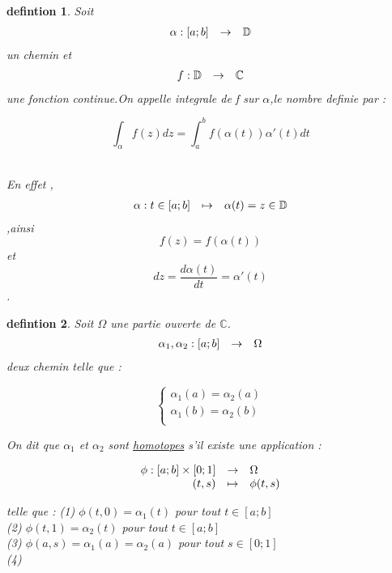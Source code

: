 \documentclass[a4paper,12pt]{book}
\newtheorem{definition}{defintion}[section]
\begin{document}
   \begin{definition}
   	Soit 
   	\[ \begin{array}{r c l}
   		\alpha: [a;b] & \to &  \mathbb{D}\\
   	\end{array}
   	\]un chemin et 
   	\[
   	\begin{array}{r c l}
   		f: \mathbb{D} & \to & \mathbb{C}
   	\end{array}\]une fonction continue.On appelle integrale de f sur $\alpha$,le nombre definie par :\\
   \begin{center}
   	 $$\int_{\alpha}f(z)dz = \int_{a}^{b}f(\alpha(t))\alpha'(t)dt$$\\
   \end{center}
En effet ,\[
\begin{array}{r c l}
	\alpha: t\in [a;b] & \mapsto & \alpha(t)=z \in \mathbb{D}
\end{array}\],ainsi $$f(z)=f(\alpha(t))$$ et $$ dz=\frac{d\alpha(t)}{dt}=\alpha'(t)$$.
  \end{definition}
\begin{definition}
	Soit $\Omega$ une partie ouverte de $\mathbb{C}$.
	\[
	\begin{array}{r c l}
		\alpha_1,\alpha_2 : [a;b] & \to & \Omega
	\end{array}\]deux chemin telle que :
     \begin{center}
     	\begin{equation*}
     	\begin{cases}
     	\alpha_1(a)= \alpha_2(a)\\
     	\alpha_1(b)= \alpha_2(b)\\
     	
     \end{cases}
 \end{equation*}
     \end{center}On dit que $\alpha_1$ et $\alpha_2$ sont \underline{homotopes} s'il existe une application :
 \begin{center}\[
 	\begin{array}{r c l}
 		\phi : [a;b] \times [0;1] & \to & \Omega\\
 		(t,s) & \mapsto & \phi (t,s)
 	\end{array}\]
 \end{center}telle que :
(1) $\phi(t,0)= \alpha_1(t)$ pour tout $ t\in [a;b]$\\
(2) $\phi(t,1)= \alpha_2(t)$ pour tout $ t\in [a;b]$\\
(3) $\phi(a,s)= \alpha_1(a)=\alpha_2(a)$ pour tout $ s \in [0;1]$\\
(4)
\end{definition}
\end{document}
